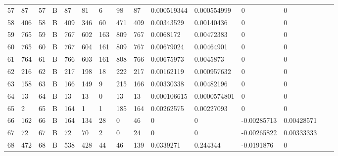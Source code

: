 \begin{longtable}{lllllllllllllll}
	57  & 87                & 57  & B   & 87                & 81                & 6                 & 98   & 87         & 0.000519344    & 0.000554999    & 0             & 0            \\
	58  & 406               & 58  & B   & 409               & 346               & 60                & 471  & 409        & 0.00343529     & 0.00140436     & 0             & 0            \\
	59  & 765               & 59  & B   & 767               & 602               & 163               & 809  & 767        & 0.0068172      & 0.00472383     & 0             & 0            \\
	60  & 765               & 60  & B   & 767               & 604               & 161               & 809  & 767        & 0.00679024     & 0.00464901     & 0             & 0            \\
	61  & 764               & 61  & B   & 766               & 603               & 161               & 808  & 766        & 0.00675973     & 0.0045873      & 0             & 0            \\
	62  & 216               & 62  & B   & 217               & 198               & 18                & 222  & 217        & 0.00162119     & 0.000957632    & 0             & 0            \\
	63  & 158               & 63  & B   & 166               & 149               & 9                 & 215  & 166        & 0.00330338     & 0.00482196     & 0             & 0            \\
	64  & 13                & 64  & B   & 13                & 13                & 0                 & 13   & 13         & 0.000106615    & 0.0000574801   & 0             & 0            \\
	65  & 2                 & 65  & B   & 164               & 1                 & 1                 & 185  & 164        & 0.00262575     & 0.00227093     & 0             & 0            \\
	66  & 162               & 66  & B   & 164               & 134               & 28                & 0    & 46         & 0              & 0              & -0.00285713   & 0.00428571   \\
	67  & 72                & 67  & B   & 72                & 70                & 2                 & 0    & 24         & 0              & 0              & -0.00265822   & 0.00333333   \\
	68  & 472               & 68  & B   & 538               & 428               & 44                & 46   & 139        & 0.0339271      & 0.244344       & -0.0191876    & 0            \\

\end{longtable}
